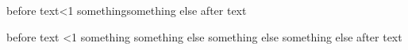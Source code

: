 before text\ifodd\x<1 something\or something else \fi after text

before text
\ifodd
    \x<1 something
    \or
        something else
    \or something else
    \or something else
        \fi
        after text
